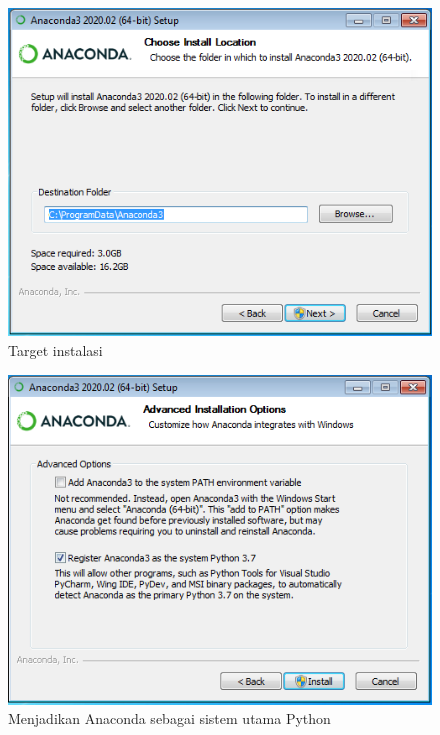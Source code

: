\begin{figure}[h!]
  \begin{center}
    \includegraphics[scale=.5]{pics/anacondaInstall4.png}
    \caption{Target instalasi}
    \label{fig:target}
  \end{center}
\end{figure}

\begin{figure}[h!]
  \begin{center}
    \includegraphics[scale=.5]{pics/anacondaInstall5.png}
    \caption{Menjadikan Anaconda sebagai sistem utama Python}
    \label{fig:utama}
  \end{center}
\end{figure}

